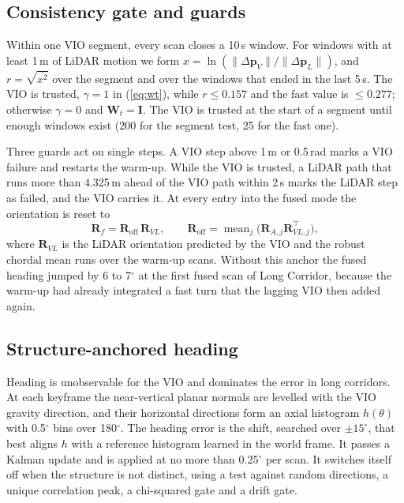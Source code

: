 \documentclass[journal]{IEEEtran}
\begin{document}
\subsection{Consistency gate and guards}\label{sec:gate}
Within one VIO segment, every scan closes a 10\,s window. For windows with at least 1\,m of LiDAR motion we form $x=\ln(\|\Delta\mathbf p_V\|/\|\Delta\mathbf p_L\|)$, and $r=\sqrt{\overline{x^2}}$ over the segment and over the windows that ended in the last 5\,s. The VIO is trusted, $\gamma=1$ in (\ref{eq:wt}), while $r\le0.157$ and the fast value is $\le0.277$; otherwise $\gamma=0$ and $\mathbf W_t=\mathbf I$. The VIO is trusted at the start of a segment until enough windows exist (200 for the segment test, 25 for the fast one).

Three guards act on single steps. A VIO step above 1\,m or 0.5\,rad marks a VIO failure and restarts the warm-up. While the VIO is trusted, a LiDAR path that runs more than 4.325\,m ahead of the VIO path within 2\,s marks the LiDAR step as failed, and the VIO carries it. At every entry into the fused mode the orientation is reset to
\begin{equation}
\mathbf R_f=\mathbf R_{\text{off}}\,\mathbf R_{VL},\qquad \mathbf R_{\text{off}}=\operatorname{mean}_j\big(\mathbf R_{A,j}\mathbf R_{VL,j}^{\top}\big),
\end{equation}
where $\mathbf R_{VL}$ is the LiDAR orientation predicted by the VIO and the robust chordal mean runs over the warm-up scans. Without this anchor the fused heading jumped by 6 to 7$^\circ$ at the first fused scan of Long Corridor, because the warm-up had already integrated a fast turn that the lagging VIO then added again.

\subsection{Structure-anchored heading}
Heading is unobservable for the VIO and dominates the error in long corridors. At each keyframe the near-vertical planar normals are levelled with the VIO gravity direction, and their horizontal directions form an axial histogram $h(\theta)$ with 0.5$^\circ$ bins over 180$^\circ$. The heading error is the shift, searched over $\pm15^\circ$, that best aligns $h$ with a reference histogram learned in the world frame. It passes a Kalman update and is applied at no more than 0.25$^\circ$ per scan. It switches itself off when the structure is not distinct, using a test against random directions, a unique correlation peak, a chi-squared gate and a drift gate.
\end{document}
